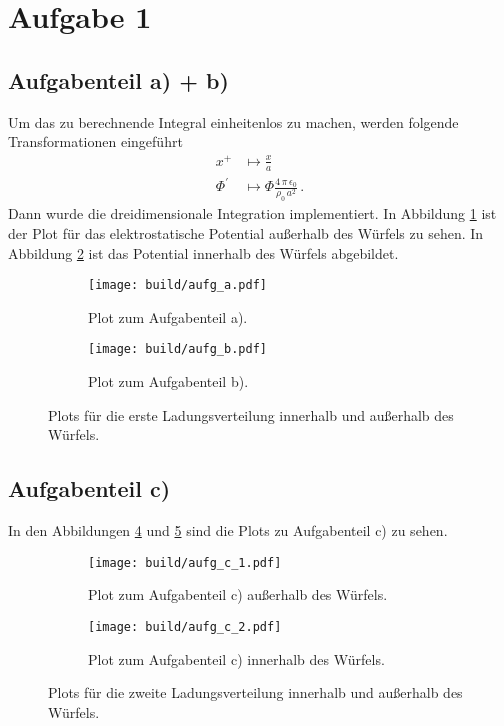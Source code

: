 \section*{Aufgabe 1}
\subsection*{Aufgabenteil a) + b)}
Um das zu berechnende Integral einheitenlos zu machen, werden folgende Transformationen
eingeführt
\begin{align*}
  x^+ &\mapsto \frac{x}{a} \\
  \Phi^{'} &\mapsto \Phi  \frac{4\, \pi \, \epsilon_0}{\rho_0 \, a^2} \, .
\end{align*}
Dann wurde die dreidimensionale Integration implementiert. In Abbildung \ref{subfig:a}
ist der Plot für das elektrostatische Potential außerhalb des Würfels zu sehen.
In Abbildung \ref{subfig:b} ist das Potential innerhalb des Würfels abgebildet.
\begin{figure}
  \centering
  \begin{subfigure}{0.49\textwidth}
    \centering
    \texttt{[image: build/aufg\_a.pdf]}
    \caption{Plot zum Aufgabenteil a).}
    \label{subfig:a}
  \end{subfigure}
  \begin{subfigure}{0.49\textwidth}
    \centering
    \texttt{[image: build/aufg\_b.pdf]}
    \caption{Plot zum Aufgabenteil b).}
    \label{subfig:b}
  \end{subfigure}
  \caption{Plots für die erste Ladungsverteilung innerhalb und außerhalb
  des Würfels.}
  \label{fig:1}
\end{figure}

\subsection*{Aufgabenteil c)}
In den Abbildungen \ref{subfig:c_1} und \ref{subfig:c_2} sind die Plots zu
Aufgabenteil c) zu sehen.
\begin{figure}
  \centering
  \begin{subfigure}{0.49\textwidth}
    \centering
    \texttt{[image: build/aufg\_c\_1.pdf]}
    \caption{Plot zum Aufgabenteil c) außerhalb des Würfels.}
    \label{subfig:c_1}
  \end{subfigure}
  \begin{subfigure}{0.49\textwidth}
    \centering
    \texttt{[image: build/aufg\_c\_2.pdf]}
    \caption{Plot zum Aufgabenteil c) innerhalb des Würfels.}
    \label{subfig:c_2}
  \end{subfigure}
  \caption{Plots für die zweite Ladungsverteilung innerhalb und außerhalb
  des Würfels.}
  \label{fig:2}
\end{figure}
